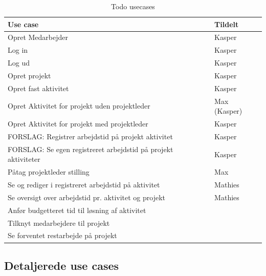 \begin{table}[H]
    \centering
    \caption{Todo usecases}
    \begin{tabular}{ll}
        Use case                                                        & Tildelt \\
        \midrule
        Opret Medarbejder                                               & Kasper  \\
        Log in                                                          & Kasper  \\
        Log ud                                                          & Kasper  \\
        Opret projekt                                                   & Kasper  \\
        Opret fast aktivitet                                            & Kasper  \\
        Opret Aktivitet for projekt uden projektleder                   & Max (Kasper)     \\
        Opret Aktivitet for projekt med projektleder                    & Kasper        \\
        FORSLAG: Registrer arbejdstid på projekt aktivitet              & Kasper  \\
        FORSLAG: Se egen registreret arbejdstid på projekt aktiviteter  & Kasper  \\
        Påtag projektleder stilling                                     & Max     \\
        Se og rediger i registreret arbejdstid på aktivitet             & Mathies \\
        Se oversigt over arbejdstid pr. aktivitet og projekt            & Mathies \\
        Anfør budgetteret tid til løsning af aktivitet                  &         \\
        Tilknyt medarbejdere til projekt                                &         \\
        Se forventet restarbejde på projekt                             &         \\
    \end{tabular}
\end{table}


\subsection{Detaljerede use cases}
